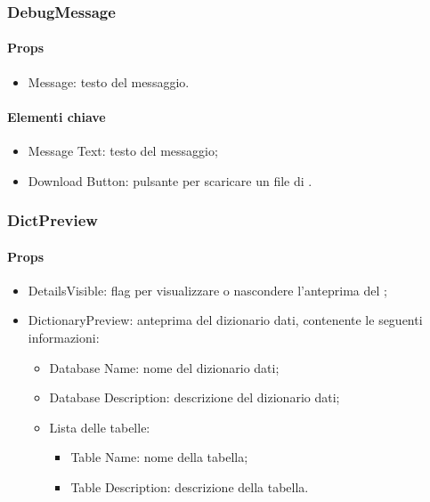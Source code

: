 \subsubsection{DebugMessage}

\paragraph*{Props}
\begin{itemize}
  \item Message: testo del messaggio.
\end{itemize}

\paragraph*{Elementi chiave}
\begin{itemize}
  \item Message Text: testo del messaggio;
  \item Download Button: pulsante per scaricare un file di .
\end{itemize}

\subsubsection{DictPreview}

\paragraph*{Props}
\begin{itemize}
  \item DetailsVisible: flag per visualizzare o nascondere l'anteprima del ;
  \item DictionaryPreview: anteprima del dizionario dati, contenente le seguenti informazioni:
  \begin{itemize}
    \item Database Name: nome del dizionario dati;
    \item Database Description: descrizione del dizionario dati;
    \item Lista delle tabelle: 
    \begin{itemize}
      \item Table Name: nome della tabella;
      \item Table Description: descrizione della tabella.
    \end{itemize}
  \end{itemize}
\end{itemize}

